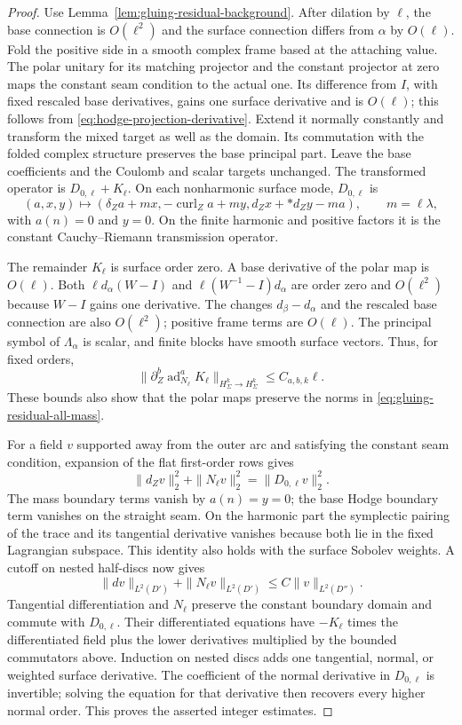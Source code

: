 \documentclass[11pt]{amsart}
\theoremstyle{definition}
\theoremstyle{remark}
\theoremstyle{plain}
\begin{document}
\begin{proof}
Use Lemma~\ref{lem:gluing-residual-background}. After dilation by
$\ell$, the base connection is $O(\ell^2)$ and the surface
connection differs from $\alpha$ by $O(\ell)$. Fold the positive
side in a smooth complex frame based at the attaching value. The
polar unitary for its matching projector and the constant projector
at zero maps the constant seam condition to the actual one. Its
difference from $I$, with fixed rescaled base derivatives, gains
one surface derivative and is $O(\ell)$; this follows from
\eqref{eq:hodge-projection-derivative}. Extend it normally constantly
and transform the mixed target as well as the domain. Its commutation
with the folded complex structure preserves the base principal part.
Leave the base coefficients and the Coulomb and scalar targets unchanged.
The transformed operator is $D_{0,\ell}+K_\ell$. On each
nonharmonic surface mode, $D_{0,\ell}$ is
\[
 (a,x,y)\longmapsto(\delta_Za+mx,-\operatorname{curl}_Za+my,
                          d_Zx+*d_Zy-ma),\qquad m=\ell\lambda,
\]
with $a(n)=0$ and $y=0$. On the finite harmonic and positive
factors it is the constant Cauchy--Riemann transmission operator.

The remainder $K_\ell$ is surface order zero. A base derivative
of the polar map is $O(\ell)$. Both
$\ell d_\alpha(W-I)$ and $\ell(W^{-1}-I)d_\alpha$ are
order zero and $O(\ell^2)$ because $W-I$ gains one derivative.
The changes $d_\beta-d_\alpha$ and the rescaled base connection
are also $O(\ell^2)$; positive frame terms are $O(\ell)$.
The principal symbol of $\Lambda_\alpha$ is scalar, and finite
blocks have smooth surface vectors. Thus, for fixed orders,
\[
 \|\partial_Z^b\operatorname{ad}_{N_\ell}^aK_\ell
                  \|_{H^k_\Sigma\to H^k_\Sigma}\leq C_{a,b,k}\ell.
\]
These bounds also show that the polar maps preserve the norms in
\eqref{eq:gluing-residual-all-mass}.

For a field $v$ supported away from the outer arc and satisfying
the constant seam condition, expansion of the flat first-order rows gives
\[
             \|d_Zv\|_2^2+\|N_\ell v\|_2^2
                                      =\|D_{0,\ell}v\|_2^2.
\]
The mass boundary terms vanish by $a(n)=y=0$; the base Hodge
boundary term vanishes on the straight seam. On the harmonic
part the symplectic pairing of the trace and its tangential derivative
vanishes because both lie in the fixed Lagrangian subspace. This
identity also holds with the surface Sobolev weights. A cutoff
on nested half-discs now gives
\[
       \|dv\|_{L^2(D')}+\|N_\ell v\|_{L^2(D')}
                                           \leq C\|v\|_{L^2(D'')}.
\]
Tangential differentiation and $N_\ell$ preserve the constant
boundary domain and commute with $D_{0,\ell}$. Their differentiated
equations have $-K_\ell$ times the differentiated field plus the
lower derivatives multiplied by the bounded commutators above.
Induction on nested discs adds one tangential, normal, or weighted
surface derivative. The coefficient of the normal derivative in
$D_{0,\ell}$ is invertible; solving the equation for that derivative
then recovers every higher normal order. This proves the asserted
integer estimates.


\end{proof}
\end{document}
